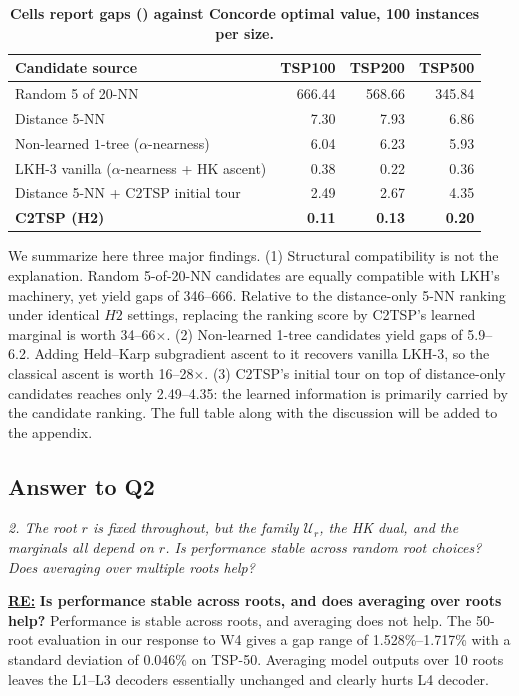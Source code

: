 \begin{table}[h]
\centering
\caption{\textbf{Cells report gaps (\text{\textpertenthousand}) against Concorde optimal value, 100 instances per size.}}
\label{tab:lkh-control}
\small
\setlength{\tabcolsep}{6pt}
\renewcommand{\arraystretch}{1.05}
\begin{tabular}{lrrr}
\toprule
Candidate source & TSP100 & TSP200 & TSP500 \\
\midrule
Random 5 of 20-NN                            & 666.44 & 568.66 & 345.84 \\
Distance 5-NN                                &   7.30 &   7.93 &   6.86 \\
Non-learned $1$-tree ($\alpha$-nearness) & 6.04 & 6.23 & 5.93 \\
LKH-3 vanilla ($\alpha$-nearness + HK ascent) & 0.38 &   0.22 &   0.36 \\
Distance 5-NN + C2TSP initial tour           &   2.49 &   2.67 &   4.35 \\
\textbf{C2TSP (H2)}                          & \textbf{0.11} & \textbf{0.13} & \textbf{0.20} \\
\bottomrule
\end{tabular}
\end{table}

We summarize here three major findings. (1) Structural compatibility is not the explanation. Random 5-of-20-NN candidates are equally compatible with LKH's machinery, yet yield gaps of 346–666. Relative to the distance-only 5-NN ranking under identical $H2$ settings, replacing the ranking score by C2TSP's learned marginal is worth 34--66$\times$. (2) Non-learned 1-tree candidates yield gaps of 5.9–6.2. Adding Held–Karp subgradient ascent to it recovers vanilla LKH-3, so the classical ascent is worth 16--28$\times$. (3) C2TSP's initial tour on top of distance-only candidates reaches only 2.49–4.35: the learned information is primarily carried by the candidate ranking. The full table along with the discussion will be added to the appendix.

\subsection{Answer to Q2}

\textit{2. The root $r$ is fixed throughout, but the family $\mathcal{U}_r$, the HK dual, and the marginals all depend on $r$. Is performance stable across random root choices? Does averaging over multiple roots help?}

\textbf{\underline{RE:}}
\textbf{Is performance stable across roots, and does averaging over roots help?} Performance is stable across roots, and averaging does not help.
The 50-root evaluation in our response to W4 gives a gap range of 1.528\%–1.717\% with a standard deviation of 0.046\% on TSP-50. Averaging model outputs over 10 roots leaves the L1–L3 decoders essentially unchanged and clearly hurts L4 decoder.


